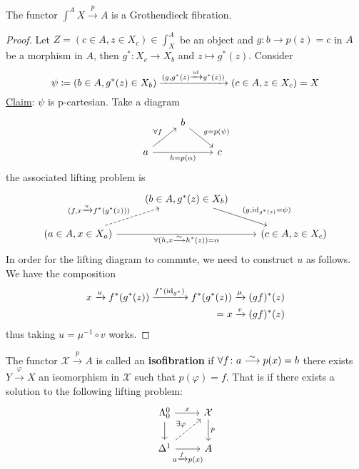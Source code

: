 \begin{prop}
	The functor $ \int^A X \xrightarrow{ p } A $ is a Grothendieck fibration.
\end{prop} 

\begin{proof}
	Let $ Z = ( c \in A , z \in X_c ) \in \int^A_X $ be an object and $g \colon b \to p ( z ) = c $ in $ A $ be a morphism in $ A $, then $ g^* \colon X_c \to X_b $ and $ z \mapsto g^* ( z ) $.
	Consider 
	\[
		\psi \coloneqq ( b \in A , g^* ( z ) \in X_b ) 
		\xrightarrow{(g , g^* ( z ) \xrightarrow{\operatorname{id}} g^* ( z ) )}
		( c \in A , z \in X_c ) = X 
	\]
	\underline{Claim}: $ \psi $ is p-cartesian.
	Take a diagram
	\[
	\begin{tikzcd}
		& 
		b
		\ar[rd, " { g = p ( \psi ) }"]
		\\
		a
		\ar[ru, " \forall f "]
		\ar[rr, " { h = p ( \alpha ) }"']
		&&
		c
	\end{tikzcd}
	\]
	the associated lifting problem is
	\[
	\begin{tikzcd}
		&
		( b \in A , g^* ( z ) \in X_b )
		\ar[rd, "{ ( g , \id_{ g^* ( z ) } = \psi ) }" ] 	
		\\
		( a \in A , x \in X_a )
		\ar[rr, " {\forall ( h , x \isomorphism h^* ( z ) ) = \alpha } "' ]
		\ar[ru, dashed , " { ( f , x \xrightarrow{ u } f^* ( g^* ( z ) ) ) } "]
		&&
		( c \in A , z \in X_c )
	\end{tikzcd}
	\]
	In order for the lifting diagram to commute, we need to construct $ u $ as follows.
	We have the composition
	\begin{align*}
		x \xrightarrow{ u } f^* ( g^* ( z ) ) \xrightarrow{ f^* ( \operatorname{id}_{ g^* } ) } f^* ( g^* ( z ) ) \xrightarrow{ \mu } ( gf )^* ( z )
		\\
		= x \xrightarrow{v} ( g f )^* ( z )  
	\end{align*}
	thus taking $ u = \mu^{ - 1 } \circ v $ works.
\end{proof}


\begin{defi}
\label{isofibration}
	The functor $ \mathcal{ X } \xrightarrow{p} A $ is called an \textbf{isofibration}
	if $ \forall f \colon a \isomorphism p ( x ) = b $ there exists $ Y \xrightarrow{\varphi} X $ an isomorphism in $ \mathcal{ X } $ such that $ p ( \varphi ) = f $.
	That is if there exists a solution to the following lifting problem:
	\[
	\begin{tikzcd}
		\Lambda_0^0
		\ar[r, " x "]
		\ar[d]
		& 
		\mathcal{ X }
		\ar[d, " p "]
		\\
		\Delta^1
		\ar[ru, dashed, " \exists \varphi"]
		\ar[r, " a \xrightarrow{f} p ( x ) "']
		&
		A
	\end{tikzcd}
	\]
\end{defi}

